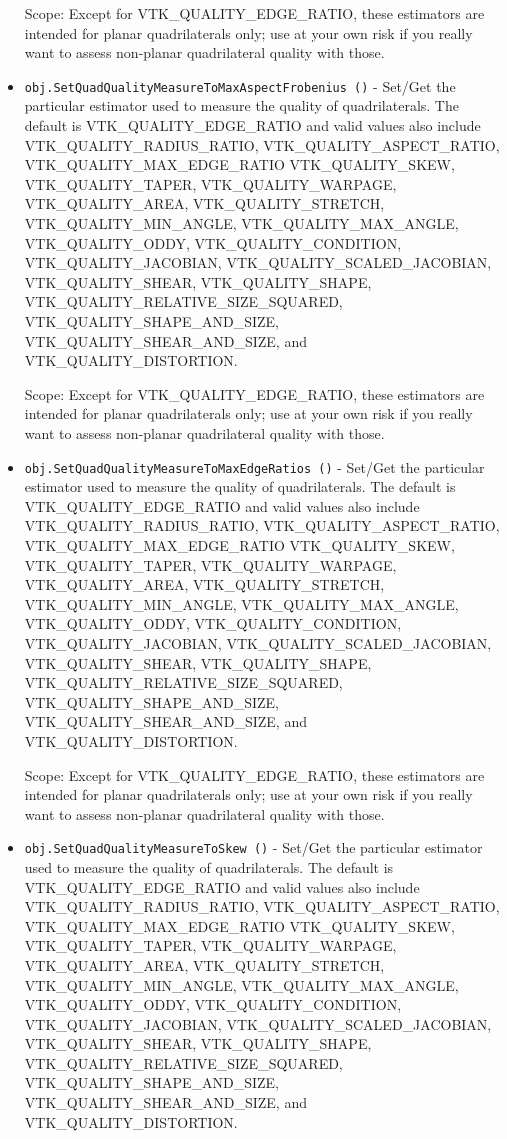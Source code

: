 \begin{itemize}
 Scope: Except for VTK\_QUALITY\_EDGE\_RATIO, these estimators are intended for planar
 quadrilaterals only; use at your own risk if you really want to assess non-planar
 quadrilateral quality with those.

\item  \verb|obj.SetQuadQualityMeasureToMaxAspectFrobenius ()| -  Set/Get the particular estimator used to measure the quality of quadrilaterals.
 The default is VTK\_QUALITY\_EDGE\_RATIO and valid values also include
 VTK\_QUALITY\_RADIUS\_RATIO, VTK\_QUALITY\_ASPECT\_RATIO, VTK\_QUALITY\_MAX\_EDGE\_RATIO
 VTK\_QUALITY\_SKEW, VTK\_QUALITY\_TAPER, VTK\_QUALITY\_WARPAGE, VTK\_QUALITY\_AREA,
 VTK\_QUALITY\_STRETCH, VTK\_QUALITY\_MIN\_ANGLE, VTK\_QUALITY\_MAX\_ANGLE,
 VTK\_QUALITY\_ODDY, VTK\_QUALITY\_CONDITION, VTK\_QUALITY\_JACOBIAN,
 VTK\_QUALITY\_SCALED\_JACOBIAN, VTK\_QUALITY\_SHEAR, VTK\_QUALITY\_SHAPE,
 VTK\_QUALITY\_RELATIVE\_SIZE\_SQUARED, VTK\_QUALITY\_SHAPE\_AND\_SIZE,
 VTK\_QUALITY\_SHEAR\_AND\_SIZE, and VTK\_QUALITY\_DISTORTION.

 Scope: Except for VTK\_QUALITY\_EDGE\_RATIO, these estimators are intended for planar
 quadrilaterals only; use at your own risk if you really want to assess non-planar
 quadrilateral quality with those.

\item  \verb|obj.SetQuadQualityMeasureToMaxEdgeRatios ()| -  Set/Get the particular estimator used to measure the quality of quadrilaterals.
 The default is VTK\_QUALITY\_EDGE\_RATIO and valid values also include
 VTK\_QUALITY\_RADIUS\_RATIO, VTK\_QUALITY\_ASPECT\_RATIO, VTK\_QUALITY\_MAX\_EDGE\_RATIO
 VTK\_QUALITY\_SKEW, VTK\_QUALITY\_TAPER, VTK\_QUALITY\_WARPAGE, VTK\_QUALITY\_AREA,
 VTK\_QUALITY\_STRETCH, VTK\_QUALITY\_MIN\_ANGLE, VTK\_QUALITY\_MAX\_ANGLE,
 VTK\_QUALITY\_ODDY, VTK\_QUALITY\_CONDITION, VTK\_QUALITY\_JACOBIAN,
 VTK\_QUALITY\_SCALED\_JACOBIAN, VTK\_QUALITY\_SHEAR, VTK\_QUALITY\_SHAPE,
 VTK\_QUALITY\_RELATIVE\_SIZE\_SQUARED, VTK\_QUALITY\_SHAPE\_AND\_SIZE,
 VTK\_QUALITY\_SHEAR\_AND\_SIZE, and VTK\_QUALITY\_DISTORTION.

 Scope: Except for VTK\_QUALITY\_EDGE\_RATIO, these estimators are intended for planar
 quadrilaterals only; use at your own risk if you really want to assess non-planar
 quadrilateral quality with those.

\item  \verb|obj.SetQuadQualityMeasureToSkew ()| -  Set/Get the particular estimator used to measure the quality of quadrilaterals.
 The default is VTK\_QUALITY\_EDGE\_RATIO and valid values also include
 VTK\_QUALITY\_RADIUS\_RATIO, VTK\_QUALITY\_ASPECT\_RATIO, VTK\_QUALITY\_MAX\_EDGE\_RATIO
 VTK\_QUALITY\_SKEW, VTK\_QUALITY\_TAPER, VTK\_QUALITY\_WARPAGE, VTK\_QUALITY\_AREA,
 VTK\_QUALITY\_STRETCH, VTK\_QUALITY\_MIN\_ANGLE, VTK\_QUALITY\_MAX\_ANGLE,
 VTK\_QUALITY\_ODDY, VTK\_QUALITY\_CONDITION, VTK\_QUALITY\_JACOBIAN,
 VTK\_QUALITY\_SCALED\_JACOBIAN, VTK\_QUALITY\_SHEAR, VTK\_QUALITY\_SHAPE,
 VTK\_QUALITY\_RELATIVE\_SIZE\_SQUARED, VTK\_QUALITY\_SHAPE\_AND\_SIZE,
 VTK\_QUALITY\_SHEAR\_AND\_SIZE, and VTK\_QUALITY\_DISTORTION.


\end{itemize}
